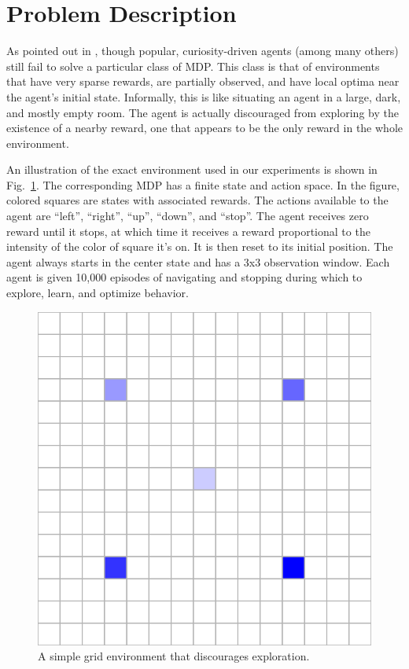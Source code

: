 \documentclass[12pt,journal,compsoc]{IEEEtran}
\begin{document}
	\section{Problem Description}
	As pointed out in \cite{malthusian_rl}, though popular, curiosity-driven agents (among many others) still fail to solve a particular class of MDP. This class is that of environments that have very sparse rewards, are partially observed, and have local optima near the agent's initial state. Informally, this is like situating an agent in a large, dark, and mostly empty room. The agent is actually discouraged from exploring by the existence of a nearby reward, one that appears to be the only reward in the whole environment.
	
	An illustration of the exact environment used in our experiments is shown in Fig.~\ref{fig:grid}. The corresponding MDP has a finite state and action space. In the figure, colored squares are states with associated rewards. The actions available to the agent are ``left'', ``right'', ``up'', ``down'', and ``stop''. The agent receives zero reward until it stops, at which time it receives a reward proportional to the intensity of the color of square it's on. It is then reset to its initial position. The agent always starts in the center state and has a 3x3 observation window. Each agent is given 10,000 episodes of navigating and stopping during which to explore, learn, and optimize behavior.
	
	\begin{figure}[h]
		\centering
		\includegraphics[width=\linewidth*4/5]{grid.png}
		\caption{A simple grid environment that discourages exploration.}
		\label{fig:grid}
	\end{figure}
	
\end{document}
